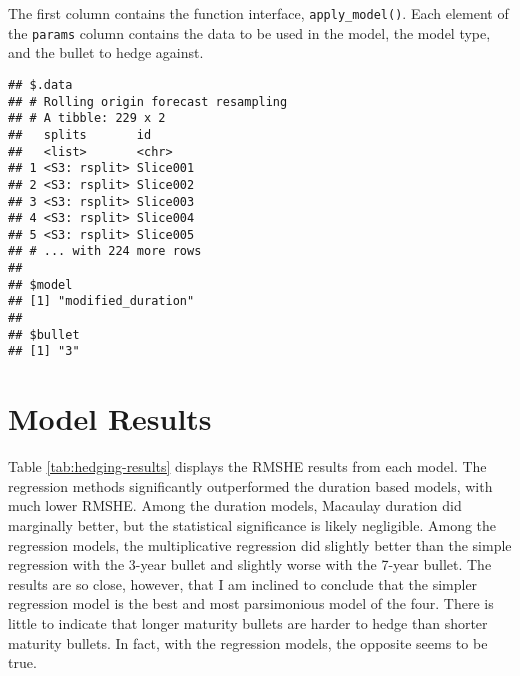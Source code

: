 \documentclass[openany]{book}
\newenvironment{Shaded}{\begin{snugshade}}{\end{snugshade}}
\newcommand{\DecValTok}[1]{\textcolor[rgb]{0.00,0.00,0.81}{#1}}
\newcommand{\NormalTok}[1]{#1}
\newcommand{\OperatorTok}[1]{\textcolor[rgb]{0.81,0.36,0.00}{\textbf{#1}}}
\theoremstyle{definition}
\theoremstyle{definition}
\theoremstyle{definition}
\theoremstyle{remark}
\begin{document}
\normalsize

The first column contains the function interface,
\texttt{apply\_model()}. Each element of the \texttt{params} column
contains the data to be used in the model, the model type, and the
bullet to hedge against.

\small

\begin{Shaded}
\end{Shaded}

\begin{verbatim}
## $.data
## # Rolling origin forecast resampling 
## # A tibble: 229 x 2
##   splits       id      
##   <list>       <chr>   
## 1 <S3: rsplit> Slice001
## 2 <S3: rsplit> Slice002
## 3 <S3: rsplit> Slice003
## 4 <S3: rsplit> Slice004
## 5 <S3: rsplit> Slice005
## # ... with 224 more rows
## 
## $model
## [1] "modified_duration"
## 
## $bullet
## [1] "3"
\end{verbatim}

\normalsize

\hypertarget{model-results}{%
\section{Model Results}\label{model-results}}

Table \ref{tab:hedging-results} displays the RMSHE results from each
model. The regression methods significantly outperformed the duration
based models, with much lower RMSHE. Among the duration models, Macaulay
duration did marginally better, but the statistical significance is
likely negligible. Among the regression models, the multiplicative
regression did slightly better than the simple regression with the
3-year bullet and slightly worse with the 7-year bullet. The results are
so close, however, that I am inclined to conclude that the simpler
regression model is the best and most parsimonious model of the four.
There is little to indicate that longer maturity bullets are harder to
hedge than shorter maturity bullets. In fact, with the regression
models, the opposite seems to be true.

\small
\end{document}
